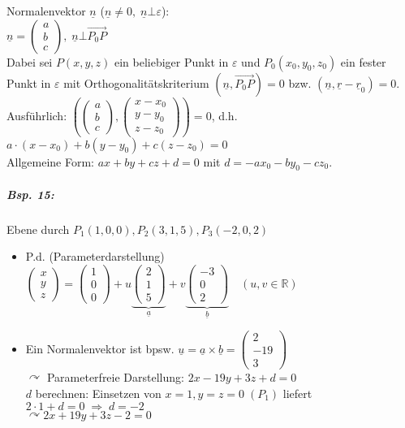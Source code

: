 \begin{enumerate}
Normalenvektor $\underline{n}$ ($\underline{n}\not = 0,\;\underline{n}\bot \varepsilon$):\\
$\underline{n}=\begin{pmatrix}
a\\
b\\
c
\end{pmatrix},\; \underline{n} \bot \overrightarrow{P_0P}$\\
Dabei sei $P(x,y,z)$ ein beliebiger Punkt in $\varepsilon$ und $P_0(x_0,y_0,z_0)$ ein fester Punkt in $\varepsilon$ mit Orthogonalitätskriterium $(\underline{n}, \overrightarrow{P_0P})=0$ bzw. $\boxed{(\underline{n}, \underline{r}-\underline{r}_0)=0}$.\\
Ausführlich: $\left(\begin{pmatrix}
a\\
b\\
c
\end{pmatrix}, \begin{pmatrix}
x-x_0\\
y-y_0\\
z-z_0
\end{pmatrix}\right)=0$, d.h. $a \cdot (x-x_0)+b(y-y_0)+c(z-z_0)=0$\\
Allgemeine Form: $\boxed{ax+by+cz+d=0}$ mit $d=-ax_0-by_0-cz_0$.
\subparagraph{Bsp. 15:} \parskp
Ebene durch $P_1(1,0,0), P_2(3,1,5), P_3(-2,0,2)$
\begin{itemize}
\item P.d. (Parameterdarstellung) $\begin{pmatrix}
x\\
y\\
z
\end{pmatrix} = \begin{pmatrix}
1\\
0\\
0
\end{pmatrix} + u \underbrace{\begin{pmatrix}
2\\
1\\
5
\end{pmatrix}}_{\underline{a}}+v \underbrace{\begin{pmatrix}
-3\\
0\\
2
\end{pmatrix}}_{\underline{b}} \quad (u,v \in \mathbb{R})$
\item Ein Normalenvektor ist bpsw. $\underline{u}=\underline{a} \times \underline{b}=\begin{pmatrix}
2\\
-19\\
3
\end{pmatrix}$\\
$\curvearrowright$ Parameterfreie Darstellung: $2x-19y+3z+d=0$\\
$d$ berechnen: Einsetzen von $x=1, y=z=0 \; (P_1)$ liefert $2\cdot 1 +d =0 \; \Rightarrow\; d=-2$\\
$\curvearrowright \boxed{2x+19y+3z-2=0}$
\end{itemize}
\end{enumerate}

